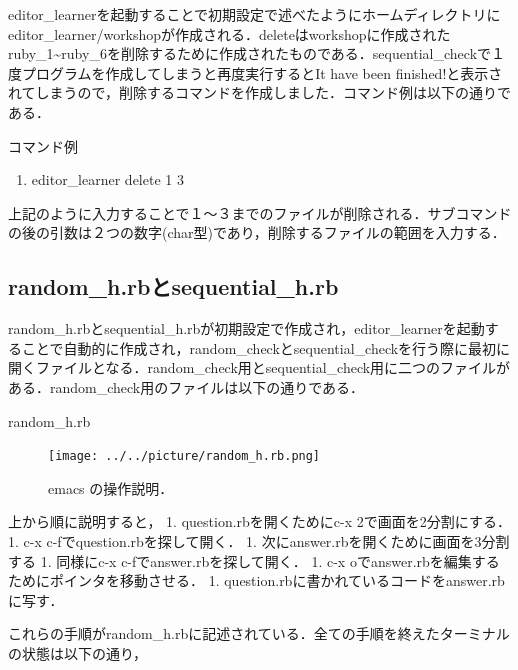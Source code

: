\documentclass[11pt,dvipdfmx]{jsarticle}
\providecommand{\tightlist}{%
      \setlength{\itemsep}{0pt}\setlength{\parskip}{0pt}}
\begin{document}
    editor\_learnerを起動することで初期設定で述べたようにホームディレクトリにeditor\_learner/workshopが作成される．deleteはworkshopに作成されたruby\_1\textasciitilde{}ruby\_6を削除するために作成されたものである．sequential\_checkで１度プログラムを作成してしまうと再度実行するとIt
have been
finished!と表示されてしまうので，削除するコマンドを作成しました．コマンド例は以下の通りである．

コマンド例

\begin{enumerate}
\def\labelenumi{\arabic{enumi}.}
\tightlist
\item
  editor\_learner delete 1 3
\end{enumerate}

上記のように入力することで１〜３までのファイルが削除される．サブコマンドの後の引数は２つの数字(char型)であり，削除するファイルの範囲を入力する．

    \subsection{random\_h.rbとsequential\_h.rb}\label{random_h.rbux3068sequential_h.rb}

random\_h.rbとsequential\_h.rbが初期設定で作成され，editor\_learnerを起動することで自動的に作成され，random\_checkとsequential\_checkを行う際に最初に開くファイルとなる．random\_check用とsequential\_check用に二つのファイルがある．random\_check用のファイルは以下の通りである．

random\_h.rb

\begin{figure}[H]
\centering
\begin{center}
\texttt{[image: ../../picture/random\_h.rb.png]}
\end{center}
\caption{emacs の操作説明．\label{random_h}}

\label{fig:}
\end{figure}

上から順に説明すると， 1. question.rbを開くためにc-x
2で画面を2分割にする． 1. c-x c-fでquestion.rbを探して開く． 1.
次にanswer.rbを開くために画面を3分割する 1. 同様にc-x
c-fでanswer.rbを探して開く． 1. c-x
oでanswer.rbを編集するためにポインタを移動させる． 1.
question.rbに書かれているコードをanswer.rbに写す．

これらの手順がrandom\_h.rbに記述されている．全ての手順を終えたターミナルの状態は以下の通り，
\end{document}
